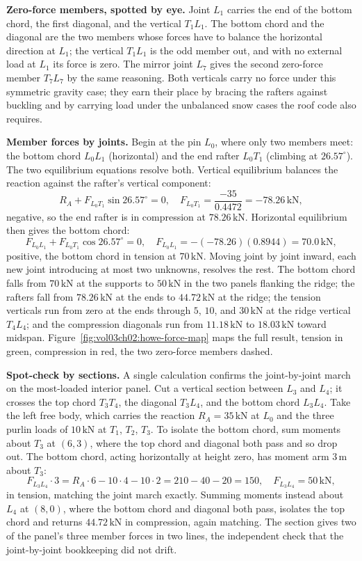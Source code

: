 \textbf{Zero-force members, spotted by eye.} Joint $L_1$ carries the
end of the bottom chord, the first diagonal, and the vertical $T_1L_1$.
The bottom chord and the diagonal are the two members whose forces have
to balance the horizontal direction at $L_1$; the vertical $T_1L_1$ is
the odd member out, and with no external load at $L_1$ its force is
zero. The mirror joint $L_7$ gives the second zero-force member $T_7L_7$
by the same reasoning. Both verticals carry no force under this
symmetric gravity case; they earn their place by bracing the rafters
against buckling and by carrying load under the unbalanced snow cases the
roof code also requires.

\textbf{Member forces by joints.} Begin at the pin $L_0$, where only two
members meet: the bottom chord $L_0L_1$ (horizontal) and the end rafter
$L_0T_1$ (climbing at $26.57^{\circ}$). The two equilibrium equations
resolve both. Vertical equilibrium balances the reaction against the
rafter's vertical component:
\[
R_A + F_{L_0T_1}\sin 26.57^{\circ} = 0, \quad
F_{L_0T_1} = \frac{-35}{0.4472} = -78.26\,\text{kN},
\]
negative, so the end rafter is in compression at $78.26\,\text{kN}$.
Horizontal equilibrium then gives the bottom chord:
\[
F_{L_0L_1} + F_{L_0T_1}\cos 26.57^{\circ} = 0, \quad
F_{L_0L_1} = -(-78.26)(0.8944) = 70.0\,\text{kN},
\]
positive, the bottom chord in tension at $70\,\text{kN}$. Moving joint by
joint inward, each new joint introducing at most two unknowns, resolves
the rest. The bottom chord falls from $70\,\text{kN}$ at the supports to
$50\,\text{kN}$ in the two panels flanking the ridge; the rafters fall
from $78.26\,\text{kN}$ at the ends to $44.72\,\text{kN}$ at the ridge;
the tension verticals run from zero at the ends through $5$, $10$, and
$30\,\text{kN}$ at the ridge vertical $T_4L_4$; and the compression
diagonals run from $11.18\,\text{kN}$ to $18.03\,\text{kN}$ toward
midspan.
Figure~\ref{fig:vol03ch02:howe-force-map} maps the full result, tension
in green, compression in red, the two zero-force members dashed.



\textbf{Spot-check by sections.} A single calculation confirms the
joint-by-joint march on the most-loaded interior panel. Cut a vertical
section between $L_3$ and $L_4$; it crosses the top chord $T_3T_4$, the
diagonal $T_3L_4$, and the bottom chord $L_3L_4$. Take the left free
body, which carries the reaction $R_A = 35\,\text{kN}$ at $L_0$ and the
three purlin loads of $10\,\text{kN}$ at $T_1$, $T_2$, $T_3$. To isolate
the bottom chord, sum moments about $T_3$ at $(6, 3)$, where the top
chord and diagonal both pass and so drop out. The bottom chord, acting
horizontally at height zero, has moment arm $3\,\si{\meter}$ about
$T_3$:
\[
F_{L_3L_4}\cdot 3 = R_A \cdot 6 - 10 \cdot 4 - 10 \cdot 2
= 210 - 40 - 20 = 150,\quad
F_{L_3L_4} = 50\,\text{kN},
\]
in tension, matching the joint march exactly. Summing moments instead
about $L_4$ at $(8, 0)$, where the bottom chord and diagonal both pass,
isolates the top chord and returns $44.72\,\text{kN}$ in compression,
again matching. The section gives two of the panel's three member forces
in two lines, the independent check that the joint-by-joint bookkeeping
did not drift.

